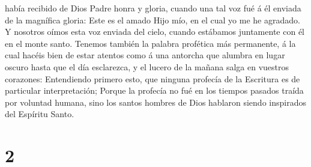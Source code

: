 había recibido de Dios Padre honra y gloria, cuando una tal voz fué á él
enviada de la magnífica gloria: Este es el amado Hijo mío, en el cual yo
me he agradado.  Y nosotros oímos esta voz enviada del
cielo, cuando estábamos juntamente con él en el monte santo.
 Tenemos también la palabra profética más permanente, á
la cual hacéis bien de estar atentos como á una antorcha que alumbra en
lugar oscuro hasta que el día esclarezca, y el lucero de la mañana salga
en vuestros corazones:  Entendiendo primero esto, que
ninguna profecía de la Escritura es de particular interpretación;
 Porque la profecía no fué en los tiempos pasados traída
por voluntad humana, sino los santos hombres de Dios hablaron siendo
inspirados del Espíritu Santo.

\hypertarget{section-1}{%
\section{2}\label{section-1}}

